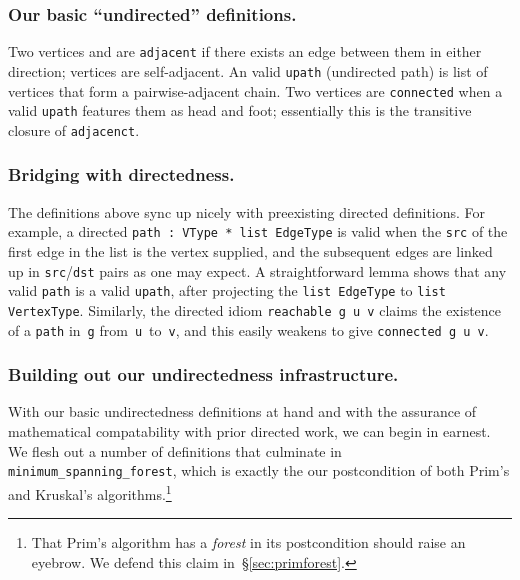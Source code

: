 \subsubsection{Our basic ``undirected'' definitions.}
Two vertices  and  are \texttt{adjacent} if there exists
an edge between them in either direction; vertices are self-adjacent.
An valid \texttt{upath} (undirected path) is list of 
vertices that form a  
pairwise-adjacent chain. Two vertices are \texttt{connected} when a valid \texttt{upath}
features them as head and foot; essentially this is the transitive 
closure of \texttt{adjacenct}.

\subsubsection{Bridging with directedness.}
The definitions above sync up nicely with preexisting directed
definitions. 
For example, a directed \texttt{path~: VType~* list~EdgeType}
is valid when the \texttt{src} of the first edge in the list 
is the vertex supplied, and the subsequent edges are linked up 
in \texttt{src}/\texttt{dst} pairs
as one may expect. A straightforward lemma shows that 
any valid \texttt{path} is a valid \texttt{upath}, after projecting the
\texttt{list EdgeType} to \texttt{list VertexType}.
Similarly, the directed idiom \texttt{reachable~g~u~v} claims the 
existence of a \texttt{path} in~\texttt{g} from~\texttt{u}~to~\texttt{v}, 
and this easily weakens to give \texttt{connected~g~u~v}.

\subsubsection{Building out our undirectedness infrastructure.}
With our basic undirectedness definitions at hand and with the assurance
of mathematical compatability with prior directed work, we can begin in 
earnest. We flesh out a number of definitions that culminate in 
\texttt{minimum\_spanning\_forest}, which is exactly the our postcondition
of both Prim's and Kruskal's algorithms.\footnote{That Prim's algorithm has
a \emph{forest} in its postcondition should raise an eyebrow. We defend this claim
in~\S\ref{sec:primforest}.}

